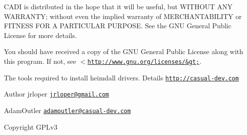 C\-A\-D\-I is distributed in the hope that it will be useful, but W\-I\-T\-H\-O\-U\-T A\-N\-Y W\-A\-R\-R\-A\-N\-T\-Y; without even the implied warranty of M\-E\-R\-C\-H\-A\-N\-T\-A\-B\-I\-L\-I\-T\-Y or F\-I\-T\-N\-E\-S\-S F\-O\-R A P\-A\-R\-T\-I\-C\-U\-L\-A\-R P\-U\-R\-P\-O\-S\-E. See the G\-N\-U General Public License for more details.

You should have received a copy of the G\-N\-U General Public License along with this program. If not, see $<$\href{http://www.gnu.org/licenses/&gt;}{\tt http\-://www.\-gnu.\-org/licenses/\&gt;}.

The tools required to install heimdall drivers. Details \href{http://casual-dev.com}{\tt http\-://casual-\/dev.\-com} \begin{DoxyAuthor}{Author}
jrloper \href{mailto:jrloper@gmail.com}{\tt jrloper@gmail.\-com} 

Adam\-Outler \href{mailto:adamoutler@casual-dev.com}{\tt adamoutler@casual-\/dev.\-com} 
\end{DoxyAuthor}
\begin{DoxyCopyright}{Copyright}
G\-P\-Lv3 
\end{DoxyCopyright}
